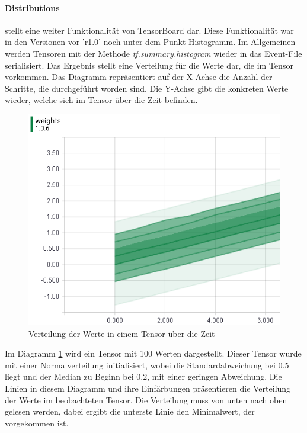 \paragraph{Distributions} stellt eine weiter Funktionalität von TensorBoard dar.  %
Diese Funktionalität war in den Versionen vor 'r1.0' noch unter dem Punkt Histogramm. 
Im Allgemeinen werden Tensoren mit der Methode \textit{tf.summary.histogram} wieder in das Event-File serialisiert. 
Das Ergebnis stellt eine Verteilung für die Werte dar, die im Tensor vorkommen. 
Das Diagramm repräsentiert auf der X-Achse die Anzahl der Schritte, die durchgeführt worden sind. 
Die Y-Achse gibt die konkreten Werte wieder, welche sich im Tensor über die Zeit befinden. 
\begin{figure}
	\centering
	\includegraphics[scale=0.8]{images/Distripution-small.png}
	\caption{Verteilung der Werte in einem Tensor über die Zeit}
	\label{fig:Verteilungsdiagram}
\end{figure}
Im Diagramm \ref{fig:Verteilungsdiagram} wird ein Tensor mit 100 Werten dargestellt. 
Dieser Tensor wurde mit einer Normalverteilung initialisiert, wobei die Standardabweichung bei $0.5$ liegt und der Median zu Beginn bei $0.2$, mit einer geringen Abweichung. 
Die Linien in diesem Diagramm und ihre Einfärbungen präsentieren die Verteilung der Werte im beobachteten Tensor. 
Die Verteilung muss von unten nach oben gelesen werden, dabei ergibt die unterste Linie den Minimalwert, der vorgekommen ist. 
